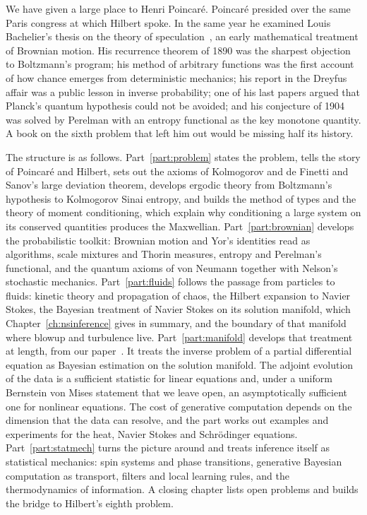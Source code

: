 We have given a large place to Henri Poincar\'e. Poincar\'e presided over the same Paris congress at which Hilbert spoke. In the same year he examined Louis Bachelier's thesis on the theory of speculation~\cite{bachelier1900}, an early mathematical treatment of Brownian motion. His recurrence theorem of 1890 was the sharpest objection to Boltzmann's program; his method of arbitrary functions was the first account of how chance emerges from deterministic mechanics; his report in the Dreyfus affair was a public lesson in inverse probability; one of his last papers argued that Planck's quantum hypothesis could not be avoided; and his conjecture of 1904 was solved by Perelman with an entropy functional as the key monotone quantity. A book on the sixth problem that left him out would be missing half its history.

The structure is as follows. Part~\ref{part:problem} states the problem, tells the story of Poincar\'e and Hilbert, sets out the axioms of Kolmogorov and de Finetti and Sanov's large deviation theorem, develops ergodic theory from Boltzmann's hypothesis to Kolmogorov Sinai entropy, and builds the method of types and the theory of moment conditioning, which explain why conditioning a large system on its conserved quantities produces the Maxwellian. Part~\ref{part:brownian} develops the probabilistic toolkit: Brownian motion and Yor's identities read as algorithms, scale mixtures and Thorin measures, entropy and Perelman's functional, and the quantum axioms of von Neumann together with Nelson's stochastic mechanics. Part~\ref{part:fluids} follows the passage from particles to fluids: kinetic theory and propagation of chaos, the Hilbert expansion to Navier Stokes, the Bayesian treatment of Navier Stokes on its solution manifold, which Chapter~\ref{ch:nsinference} gives in summary, and the boundary of that manifold where blowup and turbulence live. Part~\ref{part:manifold} develops that treatment at length, from our paper~\cite{polsonsokolov2026manifold}. It treats the inverse problem of a partial differential equation as Bayesian estimation on the solution manifold. The adjoint evolution of the data is a sufficient statistic for linear equations and, under a uniform Bernstein von Mises statement that we leave open, an asymptotically sufficient one for nonlinear equations. The cost of generative computation depends on the dimension that the data can resolve, and the part works out examples and experiments for the heat, Navier Stokes and Schr\"odinger equations. Part~\ref{part:statmech} turns the picture around and treats inference itself as statistical mechanics: spin systems and phase transitions, generative Bayesian computation as transport, filters and local learning rules, and the thermodynamics of information. A closing chapter lists open problems and builds the bridge to Hilbert's eighth problem.

